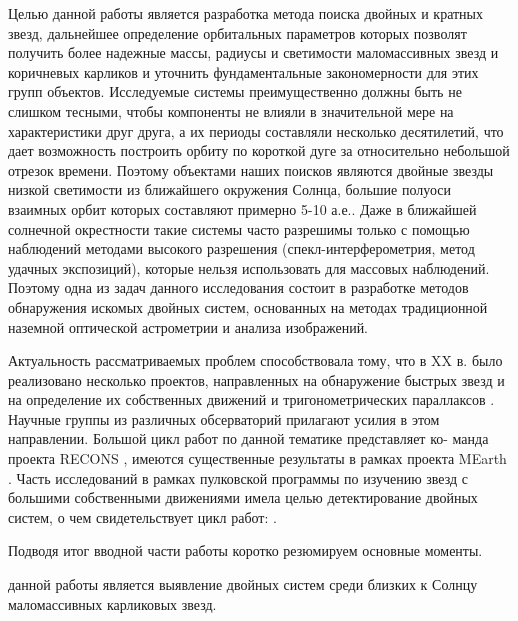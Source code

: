Целью данной работы является разработка метода поиска двойных и кратных звезд, дальнейшее определение орбитальных параметров которых позволят получить более надежные массы, радиусы и светимости маломассивных звезд и коричневых карликов и уточнить фундаментальные закономерности для этих групп объектов. Исследуемые системы преимущественно должны быть не слишком тесными, чтобы компоненты не влияли в значительной мере на характеристики друг друга, а их периоды составляли несколько десятилетий, что дает возможность построить орбиту по короткой дуге за относительно небольшой отрезок времени. Поэтому объектами наших поисков являются двойные звезды низкой светимости из ближайшего окружения Солнца, большие полуоси взаимных орбит которых составляют примерно 5-10 а.е.. Даже в ближайшей солнечной окрестности такие системы часто разрешимы только  с помощью наблюдений методами высокого разрешения  (спекл-интерферометрия, метод удачных экспозиций), которые нельзя использовать для массовых наблюдений. Поэтому одна из задач данного исследования состоит в разработке методов обнаружения искомых двойных систем, основанных на методах традиционной наземной оптической астрометрии и анализа изображений.

Актуальность рассматриваемых проблем способствовала тому, что в XX в. было реализовано несколько проектов, направленных на обнаружение быстрых звезд  и на определение их собственных движений и тригонометрических параллаксов . Научные группы из различных обсерваторий прилагают усилия в этом направлении. Большой цикл работ по данной тематике представляет ко- манда проекта RECONS , имеются существенные результаты в рамках проекта MEarth . Часть исследований в рамках пулковской программы по изучению звезд с большими собственными движениями имела целью детектирование двойных систем, о чем свидетельствует цикл работ: .

\newpage

Подводя итог вводной части работы коротко резюмируем основные моменты.

{\aim} данной работы является выявление двойных систем среди близких к Солнцу маломассивных карликовых звезд. 


